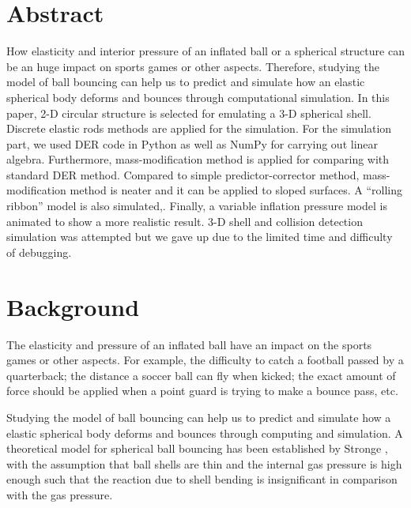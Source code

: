 \documentclass[letterpaper,9pt,twocolumn]{extarticle}
\begin{document}
\section*{Abstract}
	How elasticity and interior pressure of an inflated ball or a spherical structure can be an huge impact on sports games or other aspects. Therefore, studying the model of ball bouncing can help us to predict and simulate how an elastic spherical body deforms and bounces through computational simulation. In this paper, 2-D circular structure is selected for emulating a 3-D spherical shell. Discrete elastic rods methods are applied for the simulation. For the simulation part, we used DER code in Python as well as NumPy for carrying out linear algebra. Furthermore, mass-modification method is applied for comparing with standard DER method. Compared to simple predictor-corrector method, mass-modification method is neater and it can be applied to sloped surfaces. A ``rolling ribbon'' model \cite{Raux10} is also simulated,. Finally, a variable inflation pressure model is animated to show a more realistic result. 3-D shell and collision detection simulation was attempted but we gave up due to the limited time and difficulty of debugging. 
\section{Background}
	The elasticity and pressure of an inflated ball have an impact on the sports games or other aspects. For example, the difficulty to catch a football passed by a quarterback; the distance a soccer ball can fly when kicked; the exact amount of force should be applied when a point guard is trying to make a bounce pass, etc. 
	
	Studying the model of ball bouncing can help us to predict and simulate how a elastic spherical body deforms and bounces through computing and simulation. A theoretical model for spherical ball bouncing has been established by Stronge \cite{Stronge06}, with the assumption that ball shells are thin and the internal gas pressure is high enough such that the reaction due to shell bending is insignificant in comparison with the gas pressure. 
	
\end{document}
